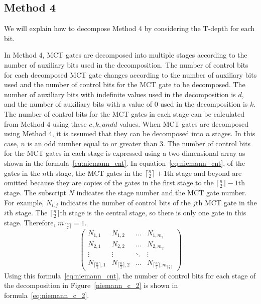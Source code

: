 \subsection{Method 4}
We will explain how to decompose Method 4 by considering the T-depth for each bit.
\par
In Method 4, MCT gates are decomposed into multiple stages according to the number of auxiliary bits used in the decomposition.
The number of control bits for each decomposed MCT gate changes according to the number of auxiliary bits used and the number of control bits for the MCT gate to be decomposed.
The number of auxiliary bits with indefinite values used in the decomposition is $d$, and the number of auxiliary bits with a value of 0 used in the decomposition is $k$.
The number of control bits for the MCT gates in each stage can be calculated from Method 4 using these $c, k, and d$ values.
When MCT gates are decomposed using Method 4, it is assumed that they can be decomposed into $n$ stages. In this case, $n$ is an odd number equal to or greater than 3.
The number of control bits for the MCT gates in each stage is expressed using a two-dimensional array as shown in the formula~\ref{eq:niemann_cnt}.
In equation~\ref{eq:niemann_cnt},
of the gates in the $n$th stage, the MCT gates in the $\lceil \frac{n}{2} \rceil+1$th stage and beyond are omitted because they are copies of the gates in the first stage to the $\lceil \frac{n}{2} \rceil -1$th stage.
The subscript $N$ indicates the stage number and the MCT gate number.
For example, $N_{i, j}$ indicates the number of control bits of the $j$th MCT gate in the $i$th stage.
The $\lceil \frac{n}{2} \rceil$th stage is the central stage, so there is only one gate in this stage.
Therefore, $m_{\lceil \frac{n}{2} \rceil}=1$.
\begin{equation}\label{eq:niemann_cnt}
 \begin{pmatrix}
 N_{1,1} & N_{1,2} & \dots & N_{1,m_{1}} \\
 N_{2,1} & N_{2,2} & \dots & N_{2,m_{2}} \\
 \vdots & \vdots & \ddots & \vdots \\
 N_{\lceil \frac{n}{2} \rceil,1} & N_{\lceil \frac{n}{2} \rceil,2} & \dots & N_{\lceil \frac{n}{2} \rceil,m_{\lceil \frac{n}{2} \rceil}} \end{pmatrix}
\end{equation}
Using this formula~\ref{eq:niemann_cnt}, the number of control bits for each stage of the decomposition in Figure~\ref{niemann_c_2} is shown in
formula~\ref{eq:niemann_c_2}.
